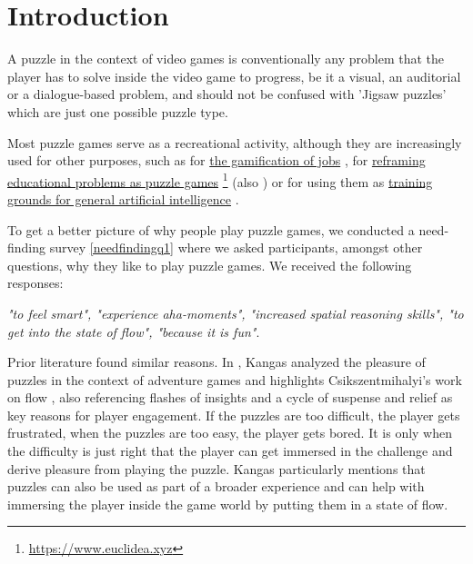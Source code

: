 
\setcounter{chapter}{0}

\chapter{Introduction}
A puzzle in the context of video games is conventionally any problem that the player has to solve inside the video game to progress, be it a visual, an auditorial or a dialogue-based problem, and should not be confused with 'Jigsaw puzzles' which are just one possible puzzle type.

Most puzzle games serve as a recreational activity, although they are increasingly used for other purposes, such as for \href{https://www.theguardian.com/technology/2014/jan/25/online-gamers-solving-sciences-biggest-problems}{the gamification of jobs} \cite{TheGuardian}, for \href{https://www.euclidea.xyz}{reframing educational problems as puzzle games} \footnote{\url{https://www.euclidea.xyz}} (also \cite{Lee2014}) or for using them as \href{http://www.gvgai.net}{training grounds for general artificial intelligence} \cite{Perez2014}.

To get a better picture of why people play puzzle games, we conducted a need-finding survey \ref{needfindingq1} where we asked participants, amongst other questions, why they like to play puzzle games. We received the following responses:

\textit{ "to feel smart", "experience aha-moments", "increased spatial reasoning skills", "to get into the state of flow", "because it is fun"}.

Prior literature found similar reasons. In \cite{Kangas2017}, Kangas analyzed the pleasure of puzzles in the context of adventure games and highlights Csikszentmihalyi's work on flow \cite{Csikszentmihalyi}, also referencing flashes of insights and a cycle of suspense and relief as key reasons for player engagement. If the puzzles are too difficult, the player gets frustrated, when the puzzles are too easy, the player gets bored. It is only when the difficulty is just right that the player can get immersed in the challenge and derive pleasure from playing the puzzle. Kangas particularly mentions that puzzles can also be used as part of a broader experience and can help with immersing the player inside the game world by putting them in a state of flow.




